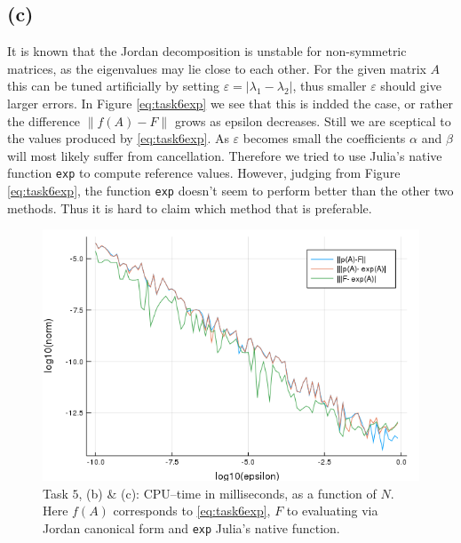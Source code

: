 \subsection*{(c)}
It is known that the Jordan decomposition is unstable for non-symmetric matrices, as the eigenvalues may lie close to each other. For the given matrix $A$ this can be tuned artificially by setting $\varepsilon=|\lambda_{1}-\lambda_{2}|$, thus smaller $\varepsilon$ should give larger errors. In  Figure \ref{eq:task6exp} we see that this is indded the case, or rather the difference $\|f(A)-F\|$ grows as epsilon decreases. Still we are sceptical to the values produced by  \eqref{eq:task6exp}. As $\varepsilon$ becomes small the coefficients $\alpha$ and $\beta$ will most likely suffer from cancellation. Therefore we tried to use Julia's native function \texttt{exp} to compute reference values. However, judging from Figure \ref{eq:task6exp}, the function \texttt{exp} doesn't seem to perform better than the other two methods. Thus it is hard to claim which method that is preferable.


\begin{figure}
\centering
\includegraphics[scale=0.6]{Task6}
\caption{Task $5$, (b) \& (c):  CPU--time in milliseconds, as a function of $N$. Here $f(A)$ corresponds to \eqref{eq:task6exp}, $F$ to evaluating via Jordan canonical form and \texttt{exp} Julia's native function.}
\label{fig:task}
\end{figure}
